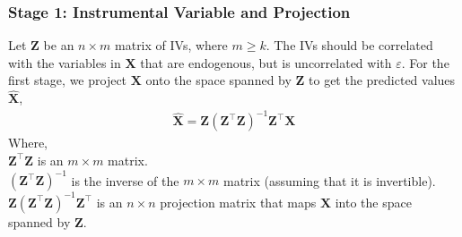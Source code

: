 \subsubsection{Stage 1: Instrumental Variable and Projection}
Let \(\mathbf{Z}\) be an \(n \times m\) matrix of IVs, where \(m \geq k\). The IVs should be correlated with the variables in \(\mathbf{X}\) that are endogenous, but is uncorrelated with \(\varepsilon\). For the first stage, we project \(\mathbf{X}\) onto the space spanned by \(\mathbf{Z}\) to get the predicted values \(\hat{\mathbf{X}}\),
\begin{align}
\hat{\mathbf{X}} = \mathbf{Z}(\mathbf{Z}^\top \mathbf{Z})^{-1}\mathbf{Z}^\top \mathbf{X}
\end{align}
Where,\\
\(\mathbf{Z}^\top \mathbf{Z}\) is an \(m \times m\) matrix. \\
\((\mathbf{Z}^\top \mathbf{Z})^{-1}\) is the inverse of the \(m \times m\) matrix (assuming that it is invertible). \\
\(\mathbf{Z}(\mathbf{Z}^\top \mathbf{Z})^{-1}\mathbf{Z}^\top\) is an \(n \times n\) projection matrix that maps \(\mathbf{X}\) into the space spanned by \(\mathbf{Z}\).
